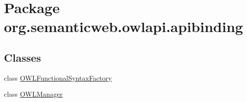 \hypertarget{namespaceorg_1_1semanticweb_1_1owlapi_1_1apibinding}{\section{Package org.\-semanticweb.\-owlapi.\-apibinding}
\label{namespaceorg_1_1semanticweb_1_1owlapi_1_1apibinding}
}
\subsection*{Classes}
\begin{DoxyCompactItemize}
\item 
class \hyperlink{classorg_1_1semanticweb_1_1owlapi_1_1apibinding_1_1_o_w_l_functional_syntax_factory}{O\-W\-L\-Functional\-Syntax\-Factory}
\item 
class \hyperlink{classorg_1_1semanticweb_1_1owlapi_1_1apibinding_1_1_o_w_l_manager}{O\-W\-L\-Manager}
\end{DoxyCompactItemize}
